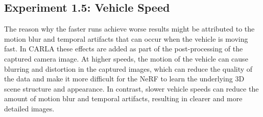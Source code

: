 \begin{comment}
The qualitative assessment shows clear evidence of higher resolution images leading to higher fidelity renders, although the metrics suggest otherwise. When using lower-resolution images, the metrics may become less sensitive because they are less affected by small differences between the synthesized and ground-truth images. This is because lower-resolution images have fewer pixels, which can make the metrics less precise in measuring the perceptual similarity between the images. However, using lower-resolution images can also lead to a loss of detail and fidelity in the synthesized images. When comparing low-resolution images with high-resolution images, these metrics may become less effective because the high-resolution images are more sensitive to small differences between the synthesized and ground-truth images. In other words, the NeRF may generate high-quality images that are perceptually similar to the ground-truth images, but small differences in the pixel values or noise can cause a significant decrease in the metric scores.

The chosen resolution of $400 \times 300$ aligns well with the chosen number of frames from the previous experiment. With 2 ticks per image, $\sim615$ images for the baseline, we have $\sim73$ million pixels. The training will cover about 84\% of the input pixels.

This might be a special case for synthetic data where we have perfect camera poses. With higher-resolution images, the requirement for accurate camera poses increases as the camera poses have to be aligned pixel perfect with the image.
\end{comment}












\subsection{Experiment 1.5: Vehicle Speed}
The reason why the faster runs achieve worse results might be attributed to the motion blur and temporal artifacts that can occur when the vehicle is moving fast. In CARLA these effects are added as part of the post-processing of the captured camera image. At higher speeds, the motion of the vehicle can cause blurring and distortion in the captured images, which can reduce the quality of the data and make it more difficult for the NeRF to learn the underlying 3D scene structure and appearance. In contrast, slower vehicle speeds can reduce the amount of motion blur and temporal artifacts, resulting in clearer and more detailed images. 

